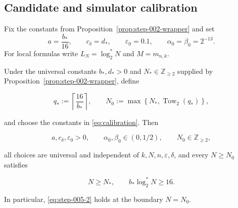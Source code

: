 \subsection{Candidate and simulator calibration}\label{app:step-005}
Fix the constants from Proposition~\ref{prop:step-002-wrapper} and set
\begin{equation}
a=\frac{b_*}{16},
\qquad c_\delta=d_*,
\qquad \varepsilon_0=0.1,
\qquad \alpha_0=\beta_0=2^{-13}.
\tag{S5.C1}\label{eq:calibration}
\end{equation}
For local formulas write $L_N=\log_2^*N$ and $M=m_{n,k}$.
\begin{lemma}\label{lem:step-005-calibration}
Under the universal constants \(b_*,d_*>0\) and
\(N_*\in\mathbb Z_{\ge2}\) supplied by Proposition~\ref{prop:step-002-wrapper}, define

\[
q_*:=\left\lceil\frac{16}{b_*}\right\rceil,
\qquad
N_0:=\max\left\{N_*,\operatorname{Tow}_2(q_*)\right\},
\tag{S5.1}\label{eq:step-005-1}
\]

and choose the constants in \eqref{eq:calibration}. Then

\[
a,c_\delta,\varepsilon_0>0,\qquad
\alpha_0,\beta_0\in(0,1/2),\qquad
N_0\in\mathbb Z_{\ge2},
\]

all choices are universal and independent of \(k,N,n,\varepsilon,\delta\),
and every \(N\ge N_0\) satisfies

\[
N\ge N_*,
\qquad
b_*\log_2^*N\ge16.
\tag{S5.2}\label{eq:step-005-2}
\]

In particular, \eqref{eq:step-005-2} holds at the boundary \(N=N_0\).
\end{lemma}

